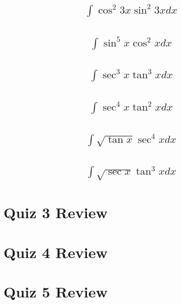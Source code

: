\documentclass{article}
\begin{document}
\subsection{
	\begin{align*}
		\int{\cos^2{3x} \sin^2{3x}dx}
	\end{align*}
}
\subsection{
	\begin{align*}
		\int{\sin^5{x} \cos^2{x} dx}
	\end{align*}
}
\subsection{
	\begin{align*}
		\int{\sec^3{x} \tan^3{x} dx}
	\end{align*}
}
\subsection{
	\begin{align*}
		\int{\sec^4{x} \tan^2{x} dx}
	\end{align*}
}
\subsection{
	\begin{align*}
		\int{\sqrt{\tan{x}} \sec^4{x} dx}
	\end{align*}
}
\subsection{
	\begin{align*}
		\int{\sqrt{\sec{x}} \tan^3{x} dx}
	\end{align*}
}


\newpage
\section{Quiz 3 Review}

\newpage
\section{Quiz 4 Review}

\newpage
\section{Quiz 5 Review}
\end{document}
